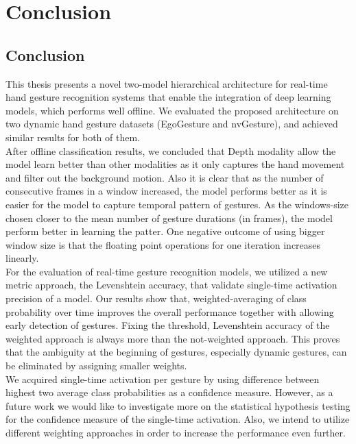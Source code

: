 \chapter{Conclusion}
\label{ch:conclusion}

\section{Conclusion}
This thesis presents a novel two-model hierarchical architecture for real-time  hand gesture recognition systems that enable the integration of deep learning models, which performs well offline. We evaluated the proposed architecture on two dynamic hand gesture datasets (EgoGesture and nvGesture), and achieved similar results for both of them.\\ 

After offline classification results, we concluded that Depth modality allow the model learn better than other modalities as it only captures the hand movement and filter out the background motion. Also it is clear that as the number of consecutive frames in a window increased, the model performs better as it is easier for the model to capture temporal pattern of gestures. As the windows-size chosen closer to the mean number of gesture durations (in frames), the model perform better in learning the patter. One negative outcome of using bigger window size is that the floating point operations for one iteration increases linearly.\\

For the evaluation of real-time gesture recognition models, we utilized a new metric approach, the Levenshtein accuracy, that validate single-time activation precision of a model. Our results show that, weighted-averaging of class probability over time improves the overall performance together with allowing early detection of gestures. Fixing the threshold, Levenshtein accuracy of the weighted approach is always more than the not-weighted approach. This proves that the ambiguity at the beginning of gestures, especially dynamic gestures,  can be eliminated by assigning smaller weights. \\

We acquired single-time activation per gesture by using difference between highest two average  class probabilities as a confidence measure. However, as a future work we would like to investigate more on the statistical hypothesis testing for the confidence measure of the single-time activation. Also, we intend to utilize different weighting approaches in order to increase the performance even further.  \\






